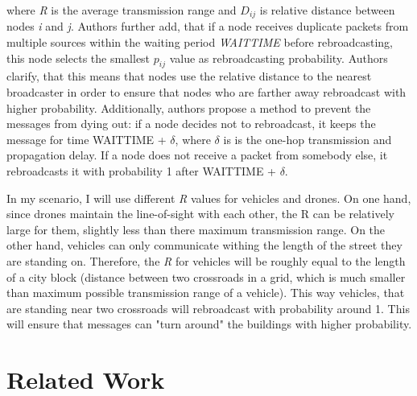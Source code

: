 \documentclass[]{nsm-thesis}
\begin{document}
where \emph{R} is the average transmission range and $D_{ij}$ is relative distance between nodes \emph{i} and \emph{j}. Authors further add, that if a node receives duplicate packets from multiple sources within the waiting period \emph{WAIT\textunderscore TIME} before rebroadcasting, this node selects the smallest $p_{ij}$ value as rebroadcasting probability. Authors clarify, that this means that nodes use the relative distance to the nearest broadcaster in order to ensure that nodes who are farther away rebroadcast with higher probability. Additionally, authors propose a method to prevent the messages from dying out: if a node decides not to rebroadcast, it keeps the message for time WAIT\textunderscore TIME + $\delta$, where $\delta$ is is the one-hop transmission and propagation delay. If a node does not receive a packet from somebody else, it rebroadcasts it with probability 1 after WAIT\textunderscore TIME + $\delta$.

In my scenario, I will use different \emph{R} values for vehicles and drones. On one hand, since drones maintain the line-of-sight with each other, the R can be relatively large for them, slightly less than there maximum transmission range. On the other hand, vehicles can only communicate withing the length of the street they are standing on. Therefore, the \emph{R} for vehicles will be roughly equal to the length of a city block (distance between two crossroads in a grid, which is much smaller than maximum possible transmission range of a vehicle). This way vehicles, that are standing near two crossroads will rebroadcast with probability around 1. This will ensure that messages can "turn around" the buildings with higher probability.

\section {Related Work}

\end{document}
